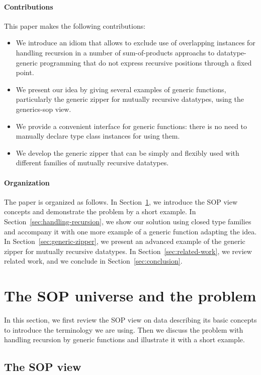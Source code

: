 \documentclass[runningheads]{llncs}
\begin{document}
\paragraph{Contributions} This paper makes the following contributions:
\begin{itemize}
\item We introduce an idiom that allows to exclude use of overlapping instances for handling recursion in a number of sum-of-products approachs to datatype-generic programming that do not express recursive positions through a fixed point.
\item We present our idea by giving several examples of generic functions, particularly the generic zipper for mutually recursive datatypes, using the \textsf{generics-sop} view.
\item We provide a convenient interface for generic functions: there is no need to manually declare type class instances for using them.
\item We develop the generic zipper that can be simply and flexibly used with different families of mutually recursive datatypes.
\end{itemize}

\paragraph{Organization} The paper is organized as follows. In Section~\ref{sec:sop-problem}, we introduce the SOP view concepts and demonstrate the problem by a short example. In Section~\ref{sec:handling-recursion}, we show our solution using closed type families and accompany it with one more example of a generic function adapting the idea. In Section~\ref{sec:generic-zipper}, we present an advanced example of the generic zipper for mutually recursive datatypes. In Section~\ref{sec:related-work}, we review related work, and we conclude in Section~\ref{sec:conclusion}.


\section{The SOP universe and the problem}
\label{sec:sop-problem}

In this section, we first review the SOP view on data describing its basic concepts to introduce the terminology we are using. Then we discuss the problem with handling recursion by generic functions and illustrate it with a short example.

\subsection{The SOP view}
\label{sec:sop-view}
\end{document}
